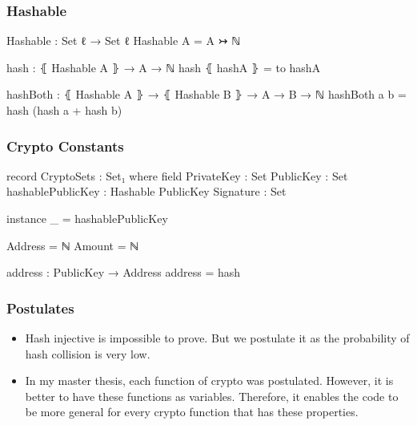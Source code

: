 \documentclass{beamer}
\begin{document}

\begin{frame}
  \frametitle{Hashable}
\begin{code}
Hashable : Set ℓ → Set ℓ
Hashable A = A ↣ ℕ
\end{code}


\begin{code}
hash : ⦃ Hashable A ⦄ → A → ℕ
hash ⦃ hashA ⦄ = to hashA

hashBoth : ⦃ Hashable A ⦄ → ⦃ Hashable B ⦄ → A → B → ℕ
hashBoth a b = hash (hash a + hash b)
\end{code}


\end{frame}


\begin{frame}
  \frametitle{Crypto Constants}
\begin{code}
record CryptoSets : Set₁ where
  field
    PrivateKey         : Set
    PublicKey          : Set
    hashablePublicKey  : Hashable PublicKey
    Signature          : Set

  instance
    _ = hashablePublicKey

  Address = ℕ
  Amount  = ℕ

  address : PublicKey → Address
  address = hash
\end{code}

\end{frame}

\begin{frame}
  \frametitle{Postulates}
  \begin{itemize}[<+->]
    \item Hash injective is impossible to prove.
      But we postulate it as the probability of hash collision is very low.
    \item In my master thesis, each function of crypto was postulated.
      However, it is better to have these functions as variables.
      Therefore, it enables the code to be more general for every crypto function that has these properties.
  \end{itemize}
\end{frame}
\end{document}
